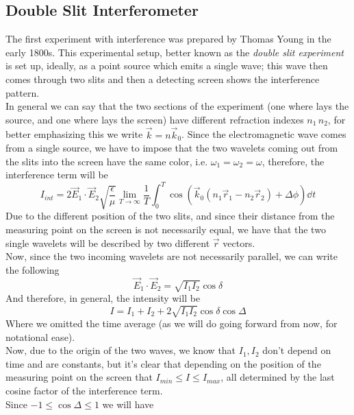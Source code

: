 \documentclass[../electromagnetism.tex]{subfiles}
\begin{document}
\subsection{Double Slit Interferometer}
The first experiment with interference was prepared by Thomas Young in the early 1800s. This experimental setup, better known as the \textit{double slit experiment} is set up, ideally, as a point source which emits a single wave; this wave then comes through two slits and then a detecting screen shows the interference pattern.\\
In general we can say that the two sections of the experiment (one where lays the source, and one where lays the screen) have different refraction indexes $n_1\, n_2$, for better emphasizing this we write $\vec{k}=n\vec{k}_0$.
Since the electromagnetic wave comes from a single source, we have to impose that the two wavelets coming out from the slits into the screen have the same color, i.e. $\omega_1=\omega_2=\omega$, therefore, the interference term will be
\begin{equation*}
	I_{int}=2\vec{E}_1\cdot\vec{E}_2\sqrt{\frac{\epsilon}{\mu}}\lim_{T\to\infty}\frac{1}{T}\int_{0}^{T}\cos\left( \vec{k}_0\left( n_1\vec{r}_1-n_2\vec{r}_2 \right)+\Delta\phi \right)\dd^{}{t}
\end{equation*}
Due to the different position of the two slits, and since their distance from the measuring point on the screen is not necessarily equal, we have that the two single wavelets will be described by two different $\vec{r}$ vectors.\\
Now, since the two incoming wavelets are not necessarily parallel, we can write the following
\begin{equation*}
	\vec{E}_1\cdot\vec{E}_2=\sqrt{I_1I_2}\cos\delta
\end{equation*}
And therefore, in general, the intensity will be
\begin{equation}
	I=I_1+I_2+2\sqrt{I_1I_2}\cos\delta\cos\Delta
	\label{eq:youngintesity.yint}
\end{equation}
Where we omitted the time average (as we will do going forward from now, for notational ease).\\
Now, due to the origin of the two waves, we know that $I_1, I_2$ don't depend on time and are constants, but it's clear that depending on the position of the measuring point on the screen that $I_{min}\le I\le I_{max}$, all determined by the last cosine factor of the interference term.\\
Since $-1\le\cos\Delta\le1$ we will have
\end{document}
